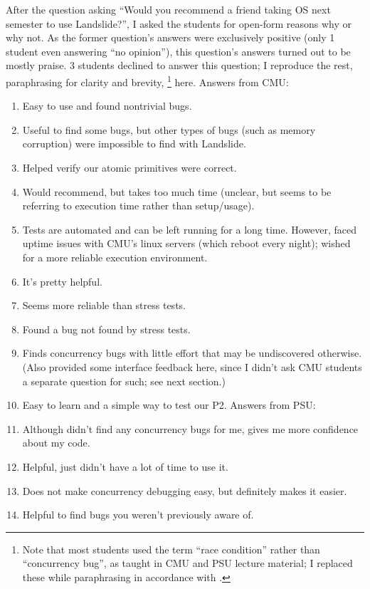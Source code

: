 After the question asking ``Would you recommend a friend taking OS next semester to use Landslide?'',
I asked the students for open-form reasons why or why not.
As the former question's answers were exclusively positive (only 1 student even answering ``no opinion''),
this question's answers turned out to be mostly praise.
3 students declined to answer this question;
I reproduce the rest, paraphrasing for clarity and brevity,%
\footnote{Note that most students used the term ``race condition'' rather than ``concurrency bug'',
as taught in CMU and PSU lecture material;
I replaced these while paraphrasing in accordance with \sect{\ref{sec:glossary}}.}
here.
Answers from CMU:

\begin{enumerate}
	\item Easy to use and found nontrivial bugs.
	\item Useful to find some bugs, but other types of bugs (such as memory corruption) were impossible to find with Landslide.
	\item Helped verify our atomic primitives were correct.
	\item Would recommend, but takes too much time (unclear, but seems to be referring to execution time rather than setup/usage).
	\item Tests are automated and can be left running for a long time.
		However, faced uptime issues with CMU's linux servers (which reboot every night);
		wished for a more reliable execution environment.
	\item It's pretty helpful. %
	\item Seems more reliable than stress tests.
	\item Found a bug not found by stress tests.
	\item Finds concurrency bugs with little effort that may be undiscovered otherwise.
		(Also provided some interface feedback here, since I didn't ask CMU students a separate question for such;
		see next section.)
	\item Easy to learn and a simple way to test our P2.
Answers from PSU:
	\item Although didn't find any concurrency bugs for me, gives me more confidence about my code.
	\item Helpful, just didn't have a lot of time to use it.
	\item Does not make concurrency debugging easy, but definitely makes it easier.
	\item Helpful to find bugs you weren't previously aware of.

\end{enumerate}
